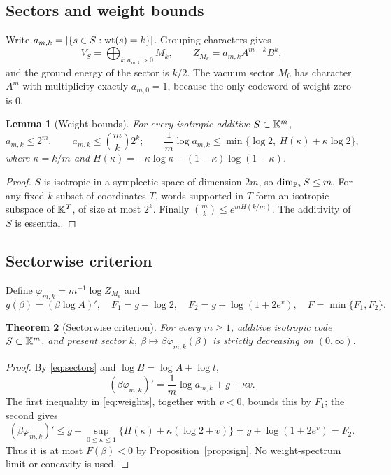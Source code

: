 \documentclass[10pt,a4paper]{article}
\numberwithin{equation}{section}
\newtheorem{theorem}{Theorem}[section]
\newtheorem{lemma}[theorem]{Lemma}\newtheorem{proposition}[theorem]{Proposition}
\theoremstyle{remark}\newtheorem{remark}[theorem]{Remark}\newtheorem{question}[theorem]{Question}
\begin{document}
\subsection{Sectors and weight bounds}
Write $a_{m,k}=|\{s\in S:\mathrm{wt}(s)=k\}|$. Grouping characters gives
\begin{equation}\label{eq:sectors}
V_S=\bigoplus_{k:a_{m,k}>0}M_k,\qquad Z_{M_k}=a_{m,k}A^{m-k}B^k,
\end{equation}
and the ground energy of the sector is $k/2$. The vacuum sector $M_0$ has character $A^m$ with multiplicity exactly $a_{m,0}=1$, because the only codeword of weight zero is $0$.
\begin{lemma}[Weight bounds]\label{lem:weights}
For every isotropic additive $S\subset\mathbb K^m$,
\begin{equation}\label{eq:weights}
a_{m,k}\le2^m,\qquad a_{m,k}\le\binom mk2^k;\qquad
\frac1m\log a_{m,k}\le\min\{\log2,\ H(\kappa)+\kappa\log2\},
\end{equation}
where $\kappa=k/m$ and $H(\kappa)=-\kappa\log\kappa-(1-\kappa)\log(1-\kappa)$.
\end{lemma}
\begin{proof}$S$ is isotropic in a symplectic space of dimension $2m$, so $\dim_{\mathbb F_2}S\le m$. For any fixed $k$-subset of coordinates $T$, words supported in $T$ form an isotropic subspace of $\mathbb K^T$, of size at most $2^k$. Finally $\binom mk\le e^{mH(k/m)}$. The additivity of $S$ is essential.\end{proof}

\subsection{Sectorwise criterion}
Define $\varphi_{m,k}=m^{-1}\log Z_{M_k}$ and
\begin{equation}\label{eq:F}
g(\beta)=(\beta\log A)',\quad
F_1=g+\log2,\quad F_2=g+\log(1+2e^v),\quad F=\min\{F_1,F_2\}.
\end{equation}
\begin{theorem}[Sectorwise criterion]\label{thm:sector}
For every $m\ge1$, additive isotropic code $S\subset\mathbb K^m$, and present sector $k$, $\beta\mapsto\beta\varphi_{m,k}(\beta)$ is strictly decreasing on $(0,\infty)$.
\end{theorem}
\begin{proof}By \eqref{eq:sectors} and $\log B=\log A+\log t$,
\[
(\beta\varphi_{m,k})'=\frac1m\log a_{m,k}+g+\kappa v.
\]
The first inequality in \eqref{eq:weights}, together with $v<0$, bounds this by $F_1$; the second gives
\[
(\beta\varphi_{m,k})'\le g+\sup_{0\le\kappa\le1}\{H(\kappa)+\kappa(\log2+v)\}
=g+\log(1+2e^v)=F_2.
\]
Thus it is at most $F(\beta)<0$ by Proposition~\ref{prop:sign}. No weight-spectrum limit or concavity is used.\end{proof}
\end{document}
